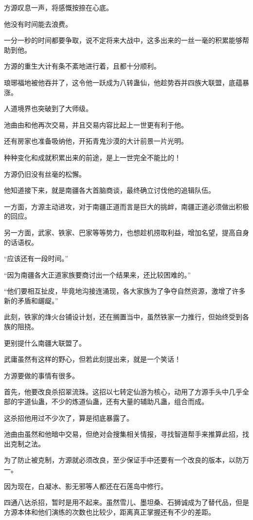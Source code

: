 \begin{this_body}
方源叹息一声，将感慨按捺在心底。

他没有时间能去浪费。

一分一秒的时间都要争取，说不定将来大战中，这多出来的一丝一毫的积累能够帮助到他。

方源的重生大计有条不紊地进行着，且都十分顺利。

琅琊福地被他吞并了，这令他一跃成为八转蛊仙，他趁势吞并四族大联盟，底蕴暴涨。

人道境界也突破到了大师级。

池曲由和他再次交易，并且交易内容比起上一世更有利于他。

还有房家也准备吸纳他，开拓青鬼沙漠的大计前景一片光明。

种种变化和成就积累出来的前途，是上一世完全不能比的！

方源仍旧没有丝毫的松懈。

他知道接下来，就是南疆各大首脑商谈，最终确立讨伐他的追辑队伍。

一方面，方源主动进攻，对于南疆正道而言是巨大的挑衅，南疆正道必须做出积极的回应。

另一方面，武家、铁家、巴家等等势力，也想趁机捞取利益，增加名望，提高自身的话语权。

“应该还有一段时间。”

“因为南疆各大正道家族要商讨出一个结果来，还比较困难的。”

“他们要相互扯皮，毕竟地沟接连涌现，各大家族为了争夺自然资源，激增了许多新的矛盾和龌龊。”

此刻，铁家的烽火台铺设计划，还在搁置当中，虽然铁家一力推行，但始终受到各族的阻挠。

更别提什么南疆大联盟了。

武庸虽然有这样的野心，但若此刻提出来，就是一个笑话！

方源要做的事情有很多。

首先，他要改良杀招翠流珠。这招以七转定仙游为核心，动用了方源手头中几乎全部的宇道仙蛊，不少的炼道仙蛊，还有大量的辅助凡蛊，组合而成。

这杀招他用过不少次了，算是彻底暴露了。

池曲由虽然和他暗中交易，但绝对会搜集相关情报，寻找智道帮手来推算此招，找出克制之法。

为了防止被克制，方源就必须改良，至少保证手中还要有一个改良的版本，以防万一。

因为现在，白凝冰、影无邪等人都还在石莲岛中修行。

四通八达杀招，暂时是用不起来。虽然雪儿、墨坦桑、石狮诚成为了替代品，但是方源本体和他们演练的次数也比较少，距离真正掌握还有不少的差距。


\end{this_body}
